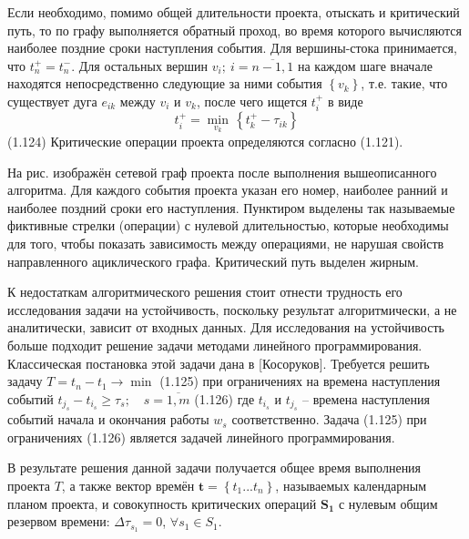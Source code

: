 Если необходимо, помимо общей длительности проекта, отыскать и критический путь, то по графу выполняется обратный проход, во время которого вычисляются наиболее поздние сроки наступления события. Для вершины-стока принимается, что $t_{n}^{+}=t_{n}^{-}$. Для остальных вершин ${{v}_{i}};\ i=\overline{n-1,1}$ на каждом шаге вначале находятся непосредственно следующие за ними события $\left\{ {{v}_{k}} \right\}$, т.е. такие, что существует дуга ${{e}_{ik}}$ между ${{v}_{i}}$ и ${{v}_{k}}$, после чего ищется $t_{i}^{+}$ в виде
	\[t_{i}^{+}=\underset{{{v}_{k}}}{\mathop{\min }}\,\left\{ t_{k}^{+}-{{\tau }_{ik}} \right\}\] 	(1.124)
Критические операции проекта определяются согласно (1.121).

На рис. изображён сетевой граф проекта после выполнения вышеописанного алгоритма. Для каждого события проекта указан его номер, наиболее ранний и наиболее поздний сроки его наступления. Пунктиром выделены так называемые фиктивные стрелки (операции) с нулевой длительностью, которые необходимы для того, чтобы показать зависимость между операциями, не нарушая свойств направленного ациклического графа. Критический путь выделен жирным.

К недостаткам алгоритмического решения стоит отнести трудность его исследования задачи на устойчивость, поскольку результат алгоритмически, а не аналитически, зависит от входных данных. Для исследования на устойчивость больше подходит решение задачи методами линейного программирования. Классическая постановка этой задачи дана в [Косоруков]. Требуется решить задачу
	$T={{t}_{n}}-{{t}_{1}}\to \min $ 	(1.125)
при ограничениях на времена наступления событий
	${{t}_{{{j}_{s}}}}-{{t}_{{{i}_{s}}}}\ge {{\tau }_{s}};\quad s=\overline{1,m}$ 	(1.126)
где ${{t}_{{{i}_{s}}}}$ и ${{t}_{{{j}_{s}}}}$ – времена наступления событий начала и окончания работы ${{w}_{s}}$ соответственно. Задача (1.125) при ограничениях (1.126) является задачей линейного программирования.

В результате решения данной задачи получается общее время выполнения проекта $T$, а также вектор времён $\mathbf{t}=\left\{ {{t}_{1}}...{{t}_{n}} \right\}$, называемых календарным планом проекта, и совокупность критических операций ${{\mathbf{S}}_{\mathbf{1}}}$ с нулевым общим резервом времени: $\Delta {{\tau }_{{{s}_{1}}}}=0$, $\forall s_1 \in S_1$.

